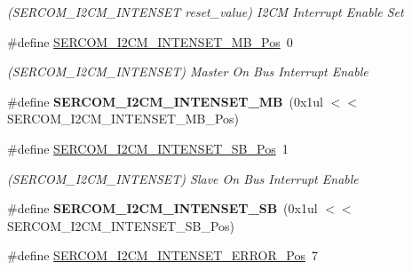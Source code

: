 \begin{DoxyCompactItemize}
\begin{DoxyCompactList}\small\item\em (S\+E\+R\+C\+O\+M\+\_\+\+I2\+C\+M\+\_\+\+I\+N\+T\+E\+N\+S\+E\+T reset\+\_\+value) I2\+C\+M Interrupt Enable Set \end{DoxyCompactList}\item 
\hypertarget{group___s_a_m_l21___s_e_r_c_o_m_gaca5a9ae0814fd8100aa982c9252086a3}{}\#define \hyperlink{group___s_a_m_l21___s_e_r_c_o_m_gaca5a9ae0814fd8100aa982c9252086a3}{S\+E\+R\+C\+O\+M\+\_\+\+I2\+C\+M\+\_\+\+I\+N\+T\+E\+N\+S\+E\+T\+\_\+\+M\+B\+\_\+\+Pos}~0\label{group___s_a_m_l21___s_e_r_c_o_m_gaca5a9ae0814fd8100aa982c9252086a3}

\begin{DoxyCompactList}\small\item\em (S\+E\+R\+C\+O\+M\+\_\+\+I2\+C\+M\+\_\+\+I\+N\+T\+E\+N\+S\+E\+T) Master On Bus Interrupt Enable \end{DoxyCompactList}\item 
\hypertarget{group___s_a_m_l21___s_e_r_c_o_m_ga94056f91841115b76ddbf4e53b275be2}{}\#define {\bfseries S\+E\+R\+C\+O\+M\+\_\+\+I2\+C\+M\+\_\+\+I\+N\+T\+E\+N\+S\+E\+T\+\_\+\+M\+B}~(0x1ul $<$$<$ S\+E\+R\+C\+O\+M\+\_\+\+I2\+C\+M\+\_\+\+I\+N\+T\+E\+N\+S\+E\+T\+\_\+\+M\+B\+\_\+\+Pos)\label{group___s_a_m_l21___s_e_r_c_o_m_ga94056f91841115b76ddbf4e53b275be2}

\item 
\hypertarget{group___s_a_m_l21___s_e_r_c_o_m_ga66b5b2830d5f46a31033af11cf0d93be}{}\#define \hyperlink{group___s_a_m_l21___s_e_r_c_o_m_ga66b5b2830d5f46a31033af11cf0d93be}{S\+E\+R\+C\+O\+M\+\_\+\+I2\+C\+M\+\_\+\+I\+N\+T\+E\+N\+S\+E\+T\+\_\+\+S\+B\+\_\+\+Pos}~1\label{group___s_a_m_l21___s_e_r_c_o_m_ga66b5b2830d5f46a31033af11cf0d93be}

\begin{DoxyCompactList}\small\item\em (S\+E\+R\+C\+O\+M\+\_\+\+I2\+C\+M\+\_\+\+I\+N\+T\+E\+N\+S\+E\+T) Slave On Bus Interrupt Enable \end{DoxyCompactList}\item 
\hypertarget{group___s_a_m_l21___s_e_r_c_o_m_ga33832afc82fdcd5bdfd300b903fe59f2}{}\#define {\bfseries S\+E\+R\+C\+O\+M\+\_\+\+I2\+C\+M\+\_\+\+I\+N\+T\+E\+N\+S\+E\+T\+\_\+\+S\+B}~(0x1ul $<$$<$ S\+E\+R\+C\+O\+M\+\_\+\+I2\+C\+M\+\_\+\+I\+N\+T\+E\+N\+S\+E\+T\+\_\+\+S\+B\+\_\+\+Pos)\label{group___s_a_m_l21___s_e_r_c_o_m_ga33832afc82fdcd5bdfd300b903fe59f2}

\item 
\hypertarget{group___s_a_m_l21___s_e_r_c_o_m_ga919bfd911ce5f36afc8894c92c724c58}{}\#define \hyperlink{group___s_a_m_l21___s_e_r_c_o_m_ga919bfd911ce5f36afc8894c92c724c58}{S\+E\+R\+C\+O\+M\+\_\+\+I2\+C\+M\+\_\+\+I\+N\+T\+E\+N\+S\+E\+T\+\_\+\+E\+R\+R\+O\+R\+\_\+\+Pos}~7\label{group___s_a_m_l21___s_e_r_c_o_m_ga919bfd911ce5f36afc8894c92c724c58}


\end{DoxyCompactItemize}
